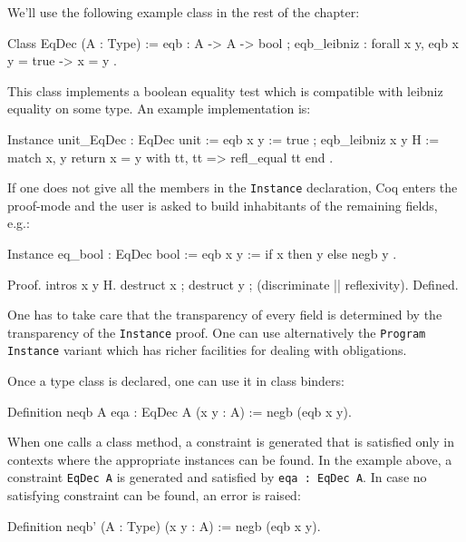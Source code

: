 We'll use the following example class in the rest of the chapter:

\begin{coq_example*}
Class EqDec (A : Type) := {
  eqb : A -> A -> bool ;
  eqb_leibniz : forall x y, eqb x y = true -> x = y }.
\end{coq_example*}

This class implements a boolean equality test which is compatible with
leibniz equality on some type. An example implementation is:

\begin{coq_example*}
Instance unit_EqDec : EqDec unit :=
{ eqb x y := true ;
  eqb_leibniz x y H := 
    match x, y return x = y with tt, tt => refl_equal tt end }.
\end{coq_example*}

If one does not give all the members in the \texttt{Instance}
declaration, Coq enters the proof-mode and the user is asked to build
inhabitants of the remaining fields, e.g.:

\begin{coq_example*}
Instance eq_bool : EqDec bool :=
{ eqb x y := if x then y else negb y }.
\end{coq_example*}
\begin{coq_example}
Proof. intros x y H.
  destruct x ; destruct y ; (discriminate || reflexivity). 
Defined.
\end{coq_example}

One has to take care that the transparency of every field is determined
by the transparency of the \texttt{Instance} proof. One can use
alternatively the \texttt{Program} \texttt{Instance}  variant which has
richer facilities for dealing with obligations.


Once a type class is declared, one can use it in class binders:
\begin{coq_example}
Definition neqb {A} {eqa : EqDec A} (x y : A) := negb (eqb x y).
\end{coq_example}

When one calls a class method, a constraint is generated that is
satisfied only in contexts where the appropriate instances can be
found. In the example above, a constraint \texttt{EqDec A} is generated and
satisfied by \texttt{{eqa : EqDec A}}. In case no satisfying constraint can be
found, an error is raised:

\begin{coq_example}
Definition neqb' (A : Type) (x y : A) := negb (eqb x y).
\end{coq_example}

